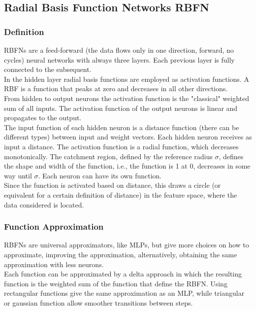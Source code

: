 \documentclass{article}
\begin{document}
	\subsection{Radial Basis Function Networks RBFN}
	
	\subsubsection{Definition}
	RBFNs are a feed-forward (the data flows only in one direction, forward, no cycles) neural networks with always three layers. Each previous layer is fully connected to the subsequent.\\
	In the hidden layer radial basis functions are employed as activation functions. A RBF is a function that peaks at zero and decreases in all other directions.\\
	
	From hidden to output neurons the activation function is the "classical" weighted sum of all inputs. The activation function of the output neurons is linear and propagates to the output.\\ 
	
	The input function of each hidden neuron is a distance function (there can be different types) between input and weight vectors. Each hidden neuron receives as input a distance. The activation function is a radial function, which decreases monotonically. The catchment region, defined by the reference radius $\sigma$, defines the shape and width of the function, i.e., the function is 1 at 0, decreases in some way until $\sigma$. Each neuron can have its own function.\\ 
	Since the function is activated based on distance, this draws a circle (or equivalent for a certain definition of distance) in the feature space, where the data considered is located.\\
	
	\subsubsection{Function Approximation}
	RBFNs are universal approximators, like MLPs, but give more choices on how to approximate, improving the approximation, alternatively, obtaining the same approximation with less neurons.\\
	
	Each function can be approximated by a delta approach in which the resulting function is the weighted sum of the function that define the RBFN. Using rectangular functions give the same approximation as an MLP, while triangular or gaussian function allow smoother transitions between steps.\\
	
\end{document}
